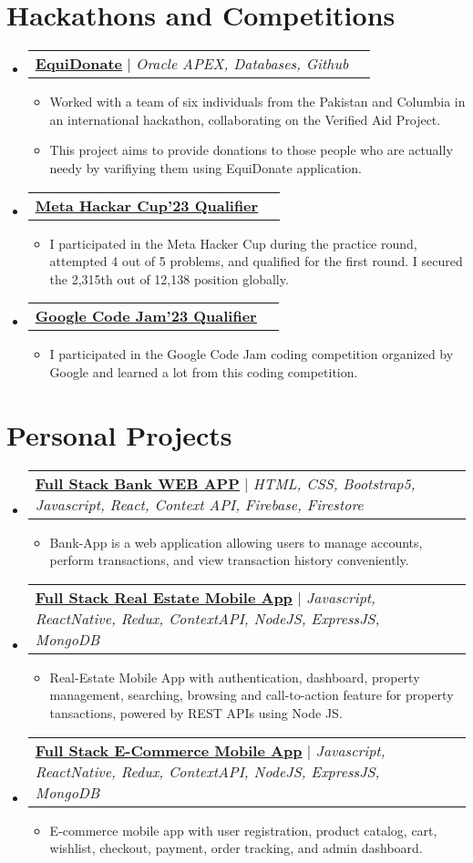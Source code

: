\documentclass[letterpaper,11pt]{article}
\makeatletter
\newcommand{\resumeItem}[1]{
  \item\small{
    {#1 \vspace{-2pt}}
  }
}
\newcommand{\resumeProjectHeading}[2]{
    \item
    \begin{tabular*}{0.97\textwidth}{l@{\extracolsep{\fill}}r}
      \small#1 & #2 \\
    \end{tabular*}\vspace{-7pt}
}
\newcommand{\resumeSubHeadingListStart}{\begin{itemize}[leftmargin=0.15in, label={}]}
\newcommand{\resumeSubHeadingListEnd}{\end{itemize}}
\newcommand{\resumeItemListStart}{\begin{itemize}}
\newcommand{\resumeItemListEnd}{\end{itemize}\vspace{-5pt}}
\makeatother
\begin{document}
\section{Hackathons and Competitions}
\resumeSubHeadingListStart
\resumeProjectHeading
{\textbf{\href{https://github.com/inamprograms/EquiDonate}{\underline{EquiDonate}}} $|$ \emph{Oracle APEX, Databases, Github}}{}
\resumeItemListStart
\resumeItem{Worked with a team of six individuals from the Pakistan and Columbia in an international hackathon, collaborating on the Verified Aid Project.}
\resumeItem{This project aims to provide donations to those people who are actually needy by varifiying them using EquiDonate application.}
\resumeItemListEnd
\resumeProjectHeading
{\textbf{\href{https://shorturl.at/kHNZ2}{\underline{Meta Hackar Cup'23 Qualifier}}}}{}
\resumeItemListStart
\resumeItem{I participated in the Meta Hacker Cup during the practice round, attempted 4 out of 5 problems, and qualified for the first round. I secured the 2,315th out of 12,138 position globally.}
\resumeItemListEnd
\resumeProjectHeading
{\textbf{\href{https://shorturl.at/myRTX}{\underline{Google Code Jam'23 Qualifier}}}}{}
\resumeItemListStart
\resumeItem{I participated in the Google Code Jam coding competition organized by Google and learned a lot from this coding competition.}
\resumeItemListEnd
\resumeSubHeadingListEnd
%


\section{Personal Projects}
\resumeSubHeadingListStart
\resumeProjectHeading
{\textbf{\href{https://github.com/Ahmadjajja/React_Bank}{\underline{Full Stack Bank WEB APP}}} $|$ \emph{HTML, CSS, Bootstrap5, Javascript, React, Context API, Firebase, Firestore}}{}
\resumeItemListStart
\resumeItem{Bank-App is a web application allowing users to manage accounts, perform
  transactions, and view transaction history conveniently.}
\resumeItemListEnd
\resumeProjectHeading
{\textbf{\href{https://github.com/Ahmadjajja/Social_Real_Estate_System_Mobile_App_Frontend}{\underline{Full Stack Real Estate Mobile App}}} $|$ \emph{Javascript, ReactNative, Redux, ContextAPI, NodeJS,
    ExpressJS, MongoDB}}{}
\resumeItemListStart
\resumeItem{Real-Estate Mobile App with authentication, dashboard, property
  management, searching, browsing and call-to-action feature for property
  tansactions, powered by REST APIs using Node JS.}
\resumeItemListEnd
\resumeProjectHeading
{\textbf{\href{https://github.com/Ahmadjajja/E_Commerce_Mobile_App_Frontend}{\underline{Full Stack E-Commerce Mobile App}}} $|$ \emph{Javascript, ReactNative, Redux, ContextAPI, NodeJS,
    ExpressJS, MongoDB}}{}
\resumeItemListStart
\resumeItem{E-commerce mobile app with user registration, product catalog, cart, wishlist,
  checkout, payment, order tracking, and admin dashboard.}
\resumeItemListEnd
\resumeSubHeadingListEnd
%
\end{document}
